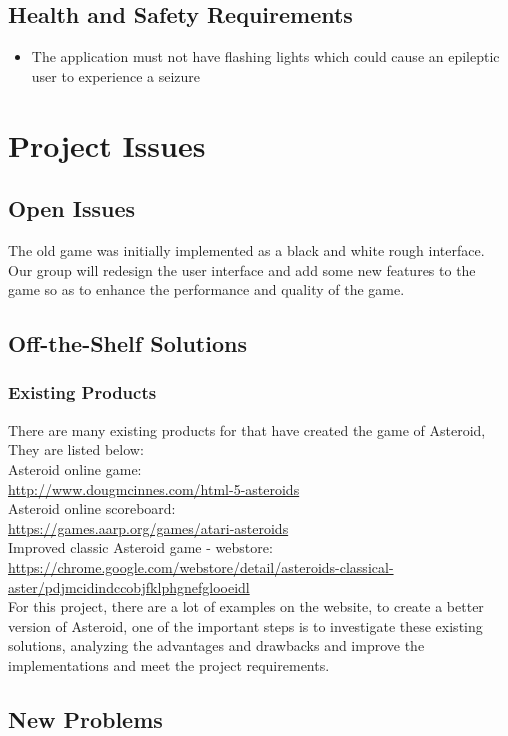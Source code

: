 \documentclass[12pt, titlepage]{article}
\begin{document}
\subsection{Health and Safety Requirements}
\begin{itemize}
    \item The application must not have flashing lights which could cause an epileptic user to experience a seizure
\end{itemize}
\section{Project Issues}

\subsection{Open Issues}
The old game was initially implemented as a black and white rough interface. Our group will redesign the user interface and add some new features to the game so as to enhance the performance and quality of the game. 


\subsection{Off-the-Shelf Solutions}
\subsubsection{Existing Products}
There are many existing products for that have created the game of Asteroid, They are listed below:\\
Asteroid online game:\\
\url{http://www.dougmcinnes.com/html-5-asteroids}\\
Asteroid online scoreboard:\\
\url{https://games.aarp.org/games/atari-asteroids}\\
Improved classic Asteroid  game - webstore:\\
\url{https://chrome.google.com/webstore/detail/asteroids-classical-aster/pdjmcidindccobjfklphgnefglooeidl}\\


For this project, there are a lot of examples on the website, to create a better version of Asteroid, one of the important steps is to investigate these existing solutions, analyzing the advantages and drawbacks and improve the implementations and meet the project requirements.


\subsection{New Problems}
\end{document}
